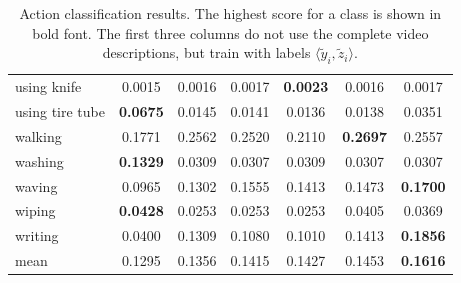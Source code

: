 \documentclass[10pt,twocolumn,letterpaper]{article}
\begin{document}
\begin{table}
\begin{center}
{\begin{tabular}{|l|c|c|c|c|c|c|}
using knife & 0.0015 & 0.0016 & 0.0017 & \textbf{0.0023} & 0.0016 & 0.0017 \\ 
using tire tube & \textbf{0.0675} & 0.0145 & 0.0141 & 0.0136 & 0.0138 & 0.0351 \\ 
walking & 0.1771 & 0.2562 & 0.2520 & 0.2110 & \textbf{0.2697} & 0.2557 \\ 
washing & \textbf{0.1329} & 0.0309 & 0.0307 & 0.0309 & 0.0307 & 0.0307 \\ 
waving & 0.0965 & 0.1302 & 0.1555 & 0.1413 & 0.1473 & \textbf{0.1700} \\ 
wiping & \textbf{0.0428} & 0.0253 & 0.0253 & 0.0253 & 0.0405 & 0.0369 \\ 
writing & 0.0400 & 0.1309 & 0.1080 & 0.1010 & 0.1413 & \textbf{0.1856} \\  
\hline \hline
mean & 0.1295 &   0.1356  &  0.1415 & 0.1427 & 0.1453 & \textbf{0.1616} \\
\hline
\end{tabular}
}
\end{center}
\caption{Action classification results. The highest score for a class is shown in bold font. The first three columns do not use the complete video descriptions, but train with labels $\langle \tilde{y}_i, \tilde{z}_i \rangle$.}
\label{tab:results_action}
\end{table}
\setlength{\tabcolsep}{1.4pt}
\end{document}
